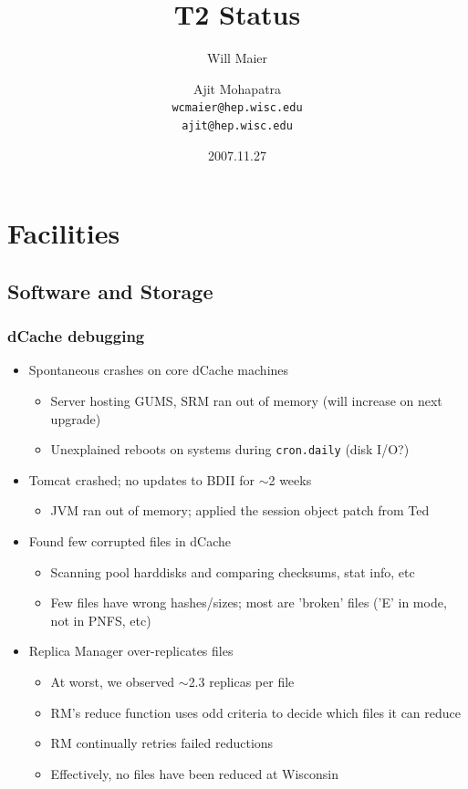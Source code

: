 \documentclass{beamer}
\title{T2 Status}
\author[Maier, Mohapatra]{
    Will Maier \and Ajit Mohapatra\\ 
    {\tt wcmaier@hep.wisc.edu}\\
    {\tt ajit@hep.wisc.edu}}
\institute[Wisconsin]{University of Wisconsin - High Energy Physics}
\date{2007.11.27}
\newcommand{\ca}{\ensuremath{\sim}}
\begin{document}
\begin{frame}
    \titlepage
\end{frame}


\section{Facilities}
\subsection{Software and Storage}
\begin{frame}
\frametitle{dCache debugging}
\begin{itemize}
    \item Spontaneous crashes on core dCache machines
    \begin{itemize}
        \item Server hosting GUMS, SRM ran out of memory (will increase on next upgrade)
        \item Unexplained reboots on systems during {\tt cron.daily} (disk I/O?)
    \end{itemize}
    \item Tomcat crashed; no updates to BDII for \ca{}2 weeks
    \begin{itemize}
        \item JVM ran out of memory; applied the session object patch from Ted
    \end{itemize}
    \item Found few corrupted files in dCache
    \begin{itemize}
        \item Scanning pool harddisks and comparing checksums, stat info, etc
        \item Few files have wrong hashes/sizes; most are 'broken' files ('E' in mode, not in PNFS, etc)
    \end{itemize}
    \item Replica Manager over-replicates files
    \begin{itemize}
        \item At worst, we observed \ca{}2.3 replicas per file
        \item RM's reduce function uses odd criteria to decide which files it can reduce
        \item RM continually retries failed reductions
        \item Effectively, no files have been reduced at Wisconsin
    \end{itemize}
\end{itemize}
\end{frame}
\end{document}
